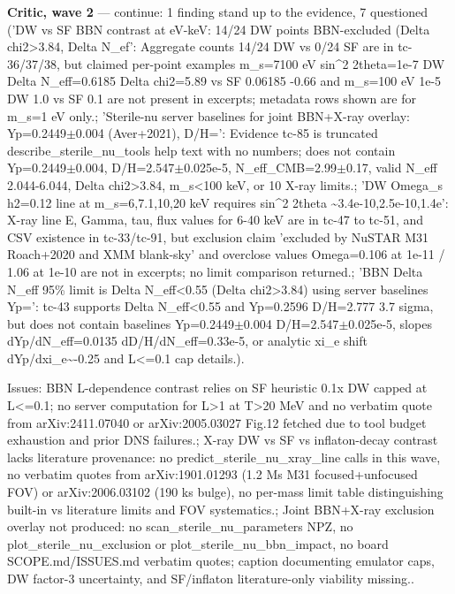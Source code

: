 \documentclass[11pt,a4paper]{article}
\begin{document}
\textbf{Critic, wave 2} --- continue: 1 finding stand up to the evidence, 7 questioned ('DW vs SF BBN contrast at eV-keV: 14/24 DW points BBN-excluded (Delta chi2\textgreater{}3.84, Delta N\_ef': Aggregate counts 14/24 DW vs 0/24 SF are in tc-36/37/38, but claimed per-point examples m\_s=7100 eV sin\textasciicircum{}2 2theta=1e-7 DW Delta N\_eff=0.6185 Delta chi2=5.89 vs SF 0.06185 -0.66 and m\_s=100 eV 1e-5 DW 1.0 vs SF 0.1 are not present in excerpts; metadata rows shown are for m\_s=1 eV only.; 'Sterile-nu server baselines for joint BBN+X-ray overlay: Yp=0.2449$\pm$0.004 (Aver+2021), D/H=': Evidence tc-85 is truncated describe\_sterile\_nu\_tools help text with no numbers; does not contain Yp=0.2449$\pm$0.004, D/H=2.547$\pm$0.025e-5, N\_eff\_CMB=2.99$\pm$0.17, valid N\_eff 2.044-6.044, Delta chi2\textgreater{}3.84, m\_s\textless{}100 keV, or 10 X-ray limits.; 'DW Omega\_s h2=0.12 line at m\_s=6,7.1,10,20 keV requires sin\textasciicircum{}2 2theta \textasciitilde{}3.4e-10,2.5e-10,1.4e': X-ray line E, Gamma, tau, flux values for 6-40 keV are in tc-47 to tc-51, and CSV existence in tc-33/tc-91, but exclusion claim 'excluded by NuSTAR M31 Roach+2020 and XMM blank-sky' and overclose values Omega=0.106 at 1e-11 / 1.06 at 1e-10 are not in excerpts; no limit comparison returned.; 'BBN Delta N\_eff 95\% limit is Delta N\_eff\textless{}0.55 (Delta chi2\textgreater{}3.84) using server baselines Yp=': tc-43 supports Delta N\_eff\textless{}0.55 and Yp=0.2596 D/H=2.777 3.7 sigma, but does not contain baselines Yp=0.2449$\pm$0.004 D/H=2.547$\pm$0.025e-5, slopes dYp/dN\_eff=0.0135 dD/H/dN\_eff=0.33e-5, or analytic xi\_e shift dYp/dxi\_e\textasciitilde{}-0.25 and L\textless{}=0.1 cap details.).

Issues: BBN L-dependence contrast relies on SF heuristic 0.1x DW capped at L\textless{}=0.1; no server computation for L\textgreater{}1 at T\textgreater{}20 MeV and no verbatim quote from arXiv:2411.07040 or arXiv:2005.03027 Fig.12 fetched due to tool budget exhaustion and prior DNS failures.; X-ray DW vs SF vs inflaton-decay contrast lacks literature provenance: no predict\_sterile\_nu\_xray\_line calls in this wave, no verbatim quotes from arXiv:1901.01293 (1.2 Ms M31 focused+unfocused FOV) or arXiv:2006.03102 (190 ks bulge), no per-mass limit table distinguishing built-in vs literature limits and FOV systematics.; Joint BBN+X-ray exclusion overlay not produced: no scan\_sterile\_nu\_parameters NPZ, no plot\_sterile\_nu\_exclusion or plot\_sterile\_nu\_bbn\_impact, no board SCOPE.md/ISSUES.md verbatim quotes; caption documenting emulator caps, DW factor-3 uncertainty, and SF/inflaton literature-only viability missing..
\end{document}
